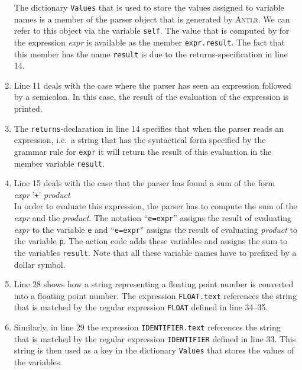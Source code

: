 \begin{enumerate}
      The dictionary \texttt{Values} that is used to store the values assigned to variable names 
      is a member of the parser object that is generated
      by \textsc{Antlr}.  We can refer to this object via the variable \texttt{self}.
      The value that is computed by for the expression \textsl{expr} is available as
      the member \texttt{expr.result}.  
      The fact that this member has the name \texttt{result} is due to the returns-specification
      in line 14.
\item Line 11 deals with the case where the parser has seen an expression followed by a semicolon.
      In this case, the result of the evaluation of the expression is printed.
\item The \texttt{returns}-declaration in line 14 specifies that when the parser reads an expression,
      i.e.~a string that has the syntactical form specified by the grammar rule for \texttt{expr}
      it will return the result of this evaluation in the member variable \texttt{result}.
\item Line 15 deals with the case that the parser has found a sum of the form
      \\[0.2cm]
      \hspace*{1.3cm}
      \textsl{expr} '\texttt{+}' \textsl{product}
      \\[0.2cm]
      In order to evaluate this expression, the parser has to compute the sum of the \textsl{expr} and the
      \textsl{product}.  The notation ``\texttt{e=expr}'' assigns the result of evaluating \textsl{expr} to the
      variable \texttt{e} and 
      ``\texttt{e=expr}'' assigns the result of evaluating \textsl{product} to the variable \texttt{p}.
      The action code adds these variables and assigns the sum to the variables \texttt{result}. 
      Note that all these variable names have to prefixed by a dollar symbol.
\item Line 28 shows how a string representing a floating point number is converted into a floating point
      number.  The expression \texttt{FLOAT.text} references the string that is matched
      by the regular expression \texttt{FLOAT} defined in line 34--35.
\item Similarly, in line 29 the expression \texttt{IDENTIFIER.text} references the string that is matched
      by the regular expression \texttt{IDENTIFIER} defined in line 33.  This string is then used as a key
      in the dictionary \texttt{Values} that stores the values of the variables.
\end{enumerate}


